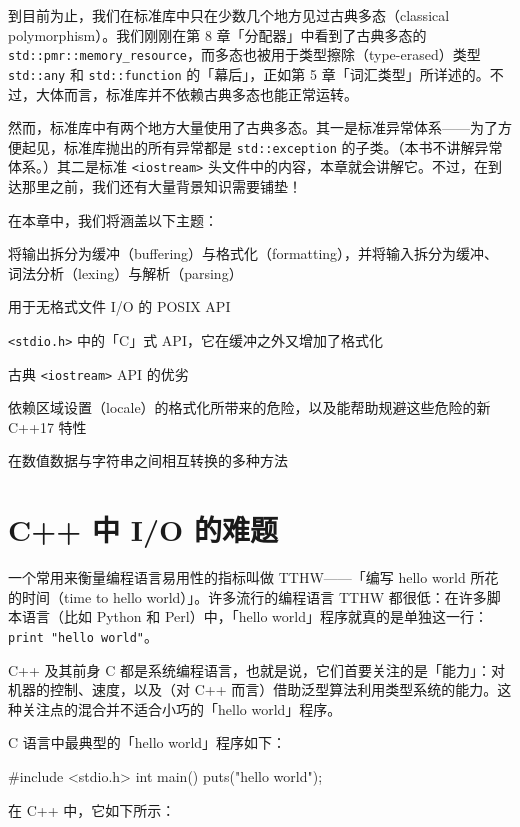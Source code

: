 到目前为止，我们在标准库中只在少数几个地方见过古典多态（classical polymorphism）。我们刚刚在第 8 章「分配器」中看到了古典多态的 \texttt{std::\allowbreak{}pmr::\allowbreak{}memory\_\allowbreak{}resource}，而多态也被用于类型擦除（type-erased）类型 \texttt{std::\allowbreak{}any} 和 \texttt{std::\allowbreak{}function} 的「幕后」，正如第 5 章「词汇类型」所详述的。不过，大体而言，标准库并不依赖古典多态也能正常运转。

然而，标准库中有两个地方大量使用了古典多态。其一是标准异常体系——为了方便起见，标准库抛出的所有异常都是 \texttt{std::\allowbreak{}exception} 的子类。（本书不讲解异常体系。）其二是标准 \texttt{<iostream>\allowbreak{}} 头文件中的内容，本章就会讲解它。不过，在到达那里之前，我们还有大量背景知识需要铺垫！

在本章中，我们将涵盖以下主题：

将输出拆分为缓冲（buffering）与格式化（formatting），并将输入拆分为缓冲、词法分析（lexing）与解析（parsing）

用于无格式文件 I/O 的 POSIX API

\texttt{<stdio.\allowbreak{}h>\allowbreak{}} 中的「C」式 API，它在缓冲之外又增加了格式化

古典 \texttt{<iostream>\allowbreak{}} API 的优劣

依赖区域设置（locale）的格式化所带来的危险，以及能帮助规避这些危险的新 C++17 特性

在数值数据与字符串之间相互转换的多种方法

\section{C++ 中 I/O 的难题}

一个常用来衡量编程语言易用性的指标叫做 TTHW——「编写 hello world 所花的时间（time to hello world）」。许多流行的编程语言 TTHW 都很低：在许多脚本语言（比如 Python 和 Perl）中，「hello world」程序就真的是单独这一行：\texttt{print "hello world"}。

C++ 及其前身 C 都是系统编程语言，也就是说，它们首要关注的是「能力」：对机器的控制、速度，以及（对 C++ 而言）借助泛型算法利用类型系统的能力。这种关注点的混合并不适合小巧的「hello world」程序。

C 语言中最典型的「hello world」程序如下：

\begin{codebox}[cpp]
    #include <stdio.h>
    int main()
    {
      puts("hello world");
    }
\end{codebox}

在 C++ 中，它如下所示：

